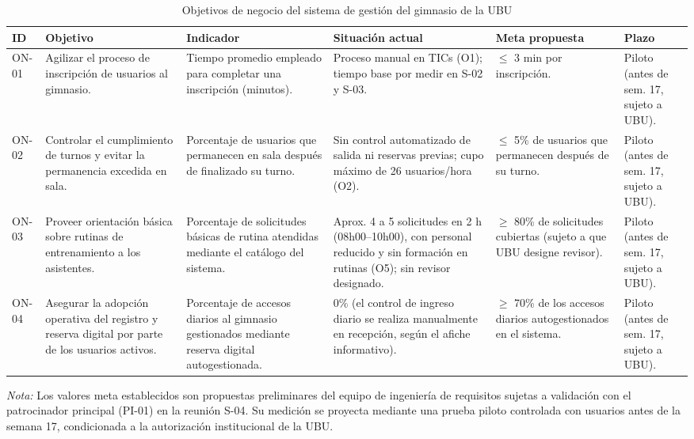 \begin{table}[htbp]
\centering
\small
\caption{Objetivos de negocio del sistema de gestión del gimnasio de la UBU}
\label{tab:objetivos}
\renewcommand{\arraystretch}{1.25}
\begin{tabular}{p{1.1cm} p{3.0cm} p{2.8cm} p{2.6cm} p{2.2cm} p{1.7cm}}
\hline
\textbf{ID} & \textbf{Objetivo} & \textbf{Indicador} & \textbf{Situación actual} & \textbf{Meta propuesta} & \textbf{Plazo} \\
\hline
ON-01 & Agilizar el proceso de inscripción de usuarios al gimnasio. & Tiempo promedio empleado para completar una inscripción (minutos). & Proceso manual en TICs (O1); tiempo base por medir en S-02 y S-03. & $\leq$ 3 min por inscripción. & Piloto (antes de sem. 17, sujeto a UBU). \\
\hline
ON-02 & Controlar el cumplimiento de turnos y evitar la permanencia excedida en sala. & Porcentaje de usuarios que permanecen en sala después de finalizado su turno. & Sin control automatizado de salida ni reservas previas; cupo máximo de 26 usuarios/hora (O2). & $\leq$ 5\% de usuarios que permanecen después de su turno. & Piloto (antes de sem. 17, sujeto a UBU). \\
\hline
ON-03 & Proveer orientación básica sobre rutinas de entrenamiento a los asistentes. & Porcentaje de solicitudes básicas de rutina atendidas mediante el catálogo del sistema. & Aprox. 4 a 5 solicitudes en 2 h (08h00--10h00), con personal reducido y sin formación en rutinas (O5); sin revisor designado. & $\geq$ 80\% de solicitudes cubiertas (sujeto a que UBU designe revisor). & Piloto (antes de sem. 17, sujeto a UBU). \\
\hline
ON-04 & Asegurar la adopción operativa del registro y reserva digital por parte de los usuarios activos. & Porcentaje de accesos diarios al gimnasio gestionados mediante reserva digital autogestionada. & 0\% (el control de ingreso diario se realiza manualmente en recepción, según el afiche informativo). & $\geq$ 70\% de los accesos diarios autogestionados en el sistema. & Piloto (antes de sem. 17, sujeto a UBU). \\
\hline
\end{tabular}
\vspace{0.2cm}
\begin{flushleft}
\footnotesize\textit{Nota:} Los valores meta establecidos son propuestas preliminares del equipo de ingeniería de requisitos sujetas a validación con el patrocinador principal (PI-01) en la reunión S-04. Su medición se proyecta mediante una prueba piloto controlada con usuarios antes de la semana 17, condicionada a la autorización institucional de la UBU.
\end{flushleft}
\end{table}

